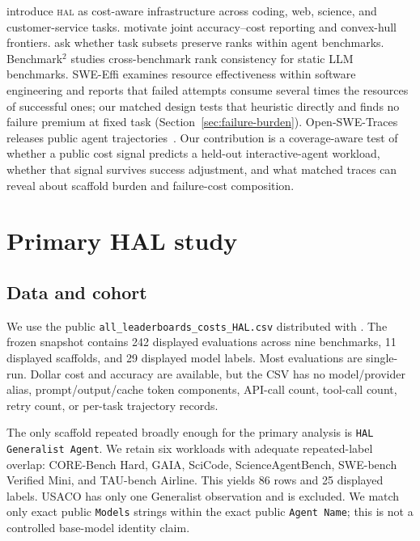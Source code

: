 \documentclass[11pt]{article}
\newcommand{\hal}{\textsc{hal}}
\begin{document}
\citet{kapoor2026hal} introduce \hal{} as cost-aware infrastructure across coding, web, science, and customer-service tasks. \citet{agentsmatter2024} motivate joint accuracy--cost reporting and convex-hull frontiers. \citet{ndzomga2026efficient} ask whether task subsets preserve ranks within agent benchmarks. Benchmark$^2$ studies cross-benchmark rank consistency for static LLM benchmarks. SWE-Effi examines resource effectiveness within software engineering and reports that failed attempts consume several times the resources of successful ones; our matched design tests that heuristic directly and finds no failure premium at fixed task (Section~\ref{sec:failure-burden}). Open-SWE-Traces releases public agent trajectories~\citep{sweeffi2025,ahmad2026openswetraces}. Our contribution is a coverage-aware test of whether a public cost signal predicts a held-out interactive-agent workload, whether that signal survives success adjustment, and what matched traces can reveal about scaffold burden and failure-cost composition.

\section{Primary HAL study}

\subsection{Data and cohort}

We use the public \texttt{all\_leaderboards\_costs\_HAL.csv} distributed with \citet{ndzomga2026efficient}. The frozen snapshot contains 242 displayed evaluations across nine benchmarks, 11 displayed scaffolds, and 29 displayed model labels. Most evaluations are single-run. Dollar cost and accuracy are available, but the CSV has no model/provider alias, prompt/output/cache token components, API-call count, tool-call count, retry count, or per-task trajectory records.

The only scaffold repeated broadly enough for the primary analysis is \texttt{HAL Generalist Agent}. We retain six workloads with adequate repeated-label overlap: CORE-Bench Hard, GAIA, SciCode, ScienceAgentBench, SWE-bench Verified Mini, and TAU-bench Airline. This yields 86 rows and 25 displayed labels. USACO has only one Generalist observation and is excluded. We match only exact public \texttt{Models} strings within the exact public \texttt{Agent Name}; this is not a controlled base-model identity claim.
\end{document}

